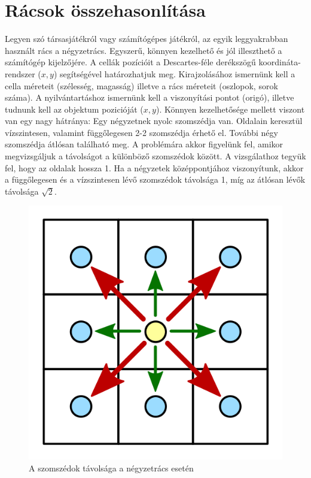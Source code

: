 
\section{Rácsok összehasonlítása}

Legyen szó társasjátékról vagy számítógépes játékról, az egyik leggyakrabban használt rács a négyzetrács. Egyszerű, könnyen kezelhető és jól illeszthető a számítógép kijelzőjére.
\newline A cellák pozícióit a Descartes-féle derékszögű koordináta-rendszer ($x, y$) segítségével határozhatjuk meg. 
\newline Kirajzolásához ismernünk kell a cella méreteit (szélesség, magasság) illetve a rács méreteit (oszlopok, sorok száma). 
\newline A nyilvántartáshoz ismernünk kell a viszonyítási pontot (origó), illetve tudnunk kell az objektum pozicióját ($x, y$).
\newline
\newline Könnyen kezelhetősége mellett viszont van egy nagy hátránya:
Egy négyzetnek nyolc szomszédja van. Oldalain keresztül vízszintesen, valamint függőlegesen 2-2 szomszédja érhető el. További négy szomszédja átlósan található meg. A problémára akkor figyelünk fel, amikor megvizsgáljuk a távolságot a különböző szomszédok között. A vizsgálathoz tegyük fel, hogy az oldalak hossza 1. Ha a négyzetek középpontjához viszonyítunk, akkor a függőlegesen és a vízszintesen lévő szomszédok távolsága 1, míg az átlósan lévők távolsága $\sqrt{2}$.
\newline

\begin{figure}[h]
\centering
\includegraphics[scale=0.2]{kepek/img21.png}
\caption{A szomszédok távolsága a négyzetrács esetén}
\label{fig:img21}
\end{figure}

